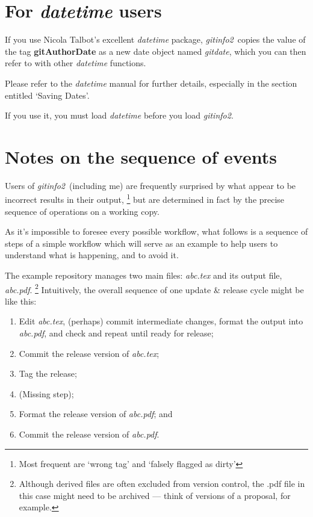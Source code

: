 \documentclass[a4paper,12pt,twoside,openany]{memoir}
\newcommand{\sfit}[1]{\textit{#1}}
\newcommand{\tpname}{\sfit{gitinfo2}}
\begin{document}
\section{For \sfit{datetime} users}
\label{sect:dtuser}
If you use Nicola Talbot's excellent \sfit{datetime} package,
\tpname\ copies the value of the tag {\ttfamily\bfseries gitAuthorDate}
as a new date object named \sfit{gitdate},
which you can then refer to with other \sfit{datetime}
functions.

Please refer to the \sfit{datetime} manual for
further details,
especially in the section entitled `Saving Dates'.

If you use it, you must load \sfit{datetime}
before you load \tpname.

\section{Notes on the sequence of events}
\label{sect:seqeve}
Users of \tpname\ (including me) are frequently surprised
by what appear to be incorrect results in their output,%
\footnote{Most frequent are `wrong tag' and `falsely flagged as dirty'}
but are determined in fact by the precise sequence of operations
on a working copy.

As it's impossible to foresee every possible workflow,
what follows is a sequence of steps of a simple workflow
which will serve as an example to help users
to understand what is happening, and to avoid it.

The example repository manages two main files:
\sfit{abc.tex} and its output file, \sfit{abc.pdf}.%
\footnote{Although derived files are often excluded from version control,
the .pdf file in this case might need to be archived ---
think of versions of a proposal, for example.}
Intuitively, the overall sequence of one update \& release cycle
might be like this:

\begin{enumerate}
\item Edit \sfit{abc.tex}, (perhaps) commit intermediate changes,
format the output into \sfit{abc.pdf}, and
check and repeat until ready for release;
\item \label{wf:tex} Commit the release version of \sfit{abc.tex};
\item \label{wf:tag} Tag the release;
\item \label{wf:git} (Missing step);
\item \label{wf:pdf} Format the release version of \sfit{abc.pdf}; and
\item Commit the release version of \sfit{abc.pdf}.
\end{enumerate}
\end{document}

